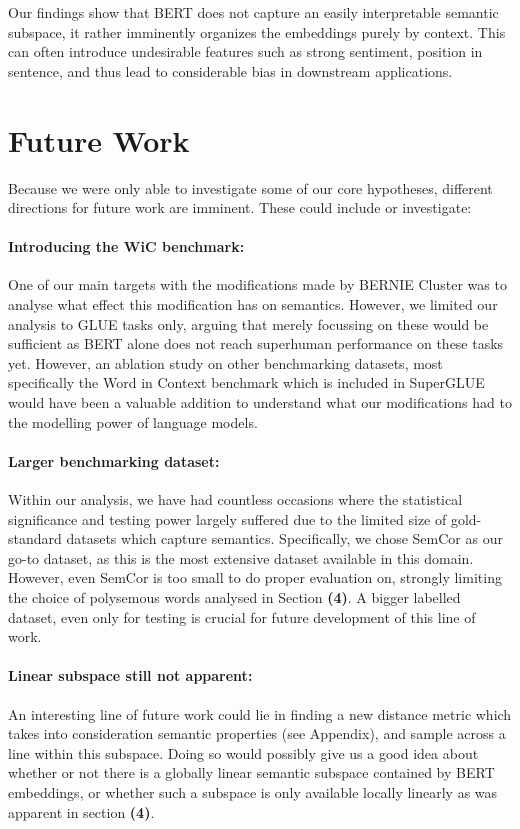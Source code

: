 \documentclass[a4paper,12pt,twoside,openright]{report}
\begin{document}
Our findings show that BERT does not capture an easily interpretable semantic subspace, it rather imminently organizes the embeddings purely by context.
This can often introduce undesirable features such as strong sentiment, position in sentence, and thus lead to considerable bias in downstream applications.

\section{Future Work}

Because we were only able to investigate some of our core hypotheses, different directions for future work are imminent.
These could include or investigate:

\paragraph{Introducing the WiC benchmark:} One of our main targets with the modifications made by BERNIE Cluster was to analyse what effect this modification has on semantics.
However, we limited our analysis to GLUE tasks only, arguing that merely focussing on these would be sufficient as BERT alone does not reach superhuman performance on these tasks yet.
However, an ablation study on other benchmarking datasets, most specifically the Word in Context benchmark which is included in SuperGLUE would have been a valuable addition to understand what our modifications had to the modelling power of language models.

\paragraph{Larger benchmarking dataset:} Within our analysis, we have had countless occasions where the statistical significance and testing power largely suffered due to the limited size of gold-standard datasets which capture semantics.
Specifically, we chose SemCor as our go-to dataset, as this is the most extensive dataset available in this domain.
However, even SemCor is too small to do proper evaluation on, strongly limiting the choice of polysemous words analysed in Section \textbf{(4)}.
A bigger labelled dataset, even only for testing is crucial for future development of this line of work.

\paragraph{Linear subspace still not apparent:} An interesting line of future work could lie in finding a new distance metric which takes into consideration semantic properties (see Appendix), and sample across a line within this subspace. 
Doing so would possibly give us a good idea about whether or not there is a globally linear semantic subspace contained by BERT embeddings, or whether such a subspace is only available locally linearly as was apparent in section \textbf{(4)}.
\end{document}
